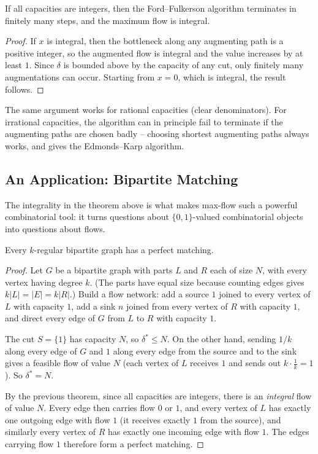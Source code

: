 \begin{theorem}[Termination]
    If all capacities are integers, then the Ford--Fulkerson algorithm terminates in finitely many steps, and the maximum flow is integral.
\end{theorem}
\begin{proof}
    If $x$ is integral, then the bottleneck along any augmenting path is a positive integer, so the augmented flow is integral and the value increases by at least $1$. Since $\delta$ is bounded above by the capacity of any cut, only finitely many augmentations can occur. Starting from $x = 0$, which is integral, the result follows.
\end{proof}

The same argument works for rational capacities (clear denominators). For irrational capacities, the algorithm can in principle fail to terminate if the augmenting paths are chosen badly -- choosing shortest augmenting paths always works, and gives the Edmonds--Karp algorithm.

\subsection{An Application: Bipartite Matching}

The integrality in the theorem above is what makes max-flow such a powerful combinatorial tool: it turns questions about $\{0,1\}$-valued combinatorial objects into questions about flows.

\begin{theorem}
    Every $k$-regular bipartite graph has a perfect matching.
\end{theorem}
\begin{proof}
    Let $G$ be a bipartite graph with parts $L$ and $R$ each of size $N$, with every vertex having degree $k$. (The parts have equal size because counting edges gives $k|L| = |E| = k|R|$.) Build a flow network: add a source $1$ joined to every vertex of $L$ with capacity $1$, add a sink $n$ joined from every vertex of $R$ with capacity $1$, and direct every edge of $G$ from $L$ to $R$ with capacity $1$.

    The cut $S = \{1\}$ has capacity $N$, so $\delta^* \leq N$. On the other hand, sending $1/k$ along every edge of $G$ and $1$ along every edge from the source and to the sink gives a feasible flow of value $N$ (each vertex of $L$ receives $1$ and sends out $k \cdot \frac 1k = 1$). So $\delta^* = N$.

    By the previous theorem, since all capacities are integers, there is an \emph{integral} flow of value $N$. Every edge then carries flow $0$ or $1$, and every vertex of $L$ has exactly one outgoing edge with flow $1$ (it receives exactly $1$ from the source), and similarly every vertex of $R$ has exactly one incoming edge with flow $1$. The edges carrying flow $1$ therefore form a perfect matching.
\end{proof}

